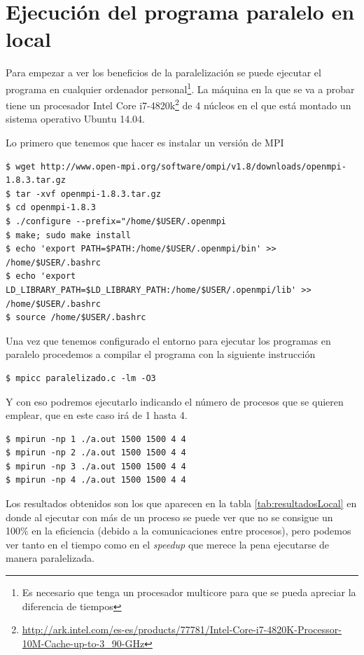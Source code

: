 \documentclass{article}
\begin{document}
\clearpage

\section{Ejecución del  programa paralelo en local}
	Para empezar a ver los beneficios de la paralelización se puede ejecutar el programa en cualquier ordenador personal\footnote{Es necesario que tenga un procesador multicore para que se pueda apreciar la diferencia de tiempos}. La máquina en la que se va a probar tiene un procesador Intel Core i7-4820k\footnote{\url{http://ark.intel.com/es-es/products/77781/Intel-Core-i7-4820K-Processor-10M-Cache-up-to-3_90-GHz}} de 4 núcleos en el que está montado un sistema operativo Ubuntu 14.04.
	
	Lo primero que tenemos que hacer es instalar un versión de MPI
\begin{lstlisting}[style=minibash]
$ wget http://www.open-mpi.org/software/ompi/v1.8/downloads/openmpi-1.8.3.tar.gz
$ tar -xvf openmpi-1.8.3.tar.gz
$ cd openmpi-1.8.3
$ ./configure --prefix="/home/$USER/.openmpi
$ make; sudo make install
$ echo 'export PATH=$PATH:/home/$USER/.openmpi/bin' >> /home/$USER/.bashrc
$ echo 'export LD_LIBRARY_PATH=$LD_LIBRARY_PATH:/home/$USER/.openmpi/lib' >> /home/$USER/.bashrc
$ source /home/$USER/.bashrc
\end{lstlisting}

	Una vez que tenemos configurado el entorno para ejecutar los programas en paralelo procedemos a compilar el programa con la siguiente instrucción
\begin{lstlisting}[style=minibash]
$ mpicc paralelizado.c -lm -O3
\end{lstlisting}
	Y con eso podremos ejecutarlo indicando el número de procesos que se quieren emplear, que en este caso irá de 1 hasta 4.
\begin{lstlisting}[style=minibash]
$ mpirun -np 1 ./a.out 1500 1500 4 4
$ mpirun -np 2 ./a.out 1500 1500 4 4
$ mpirun -np 3 ./a.out 1500 1500 4 4
$ mpirun -np 4 ./a.out 1500 1500 4 4
\end{lstlisting}

	Los resultados obtenidos son los que aparecen en la tabla \ref{tab:resultadosLocal} en donde al ejecutar con más de un proceso se puede ver que no se consigue un 100\% en la eficiencia (debido a la comunicaciones entre procesos), pero podemos ver tanto en el tiempo como en el \textit{speedup} que merece la pena ejecutarse de manera paralelizada.
	
\end{document}
